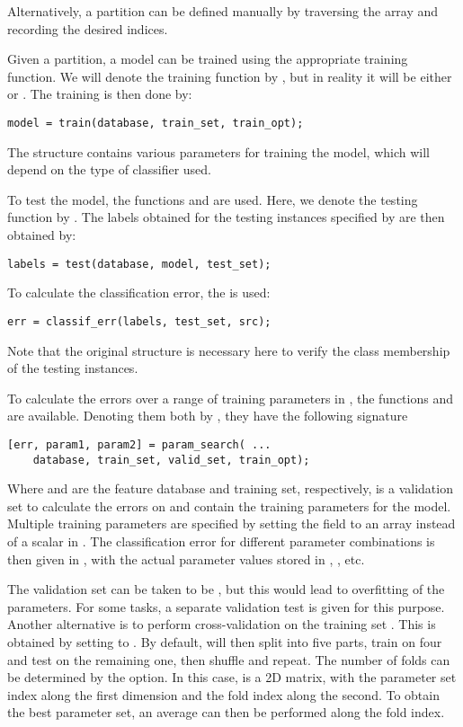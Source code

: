 \documentclass[twocolumn]{article}
\begin{document}
Alternatively, a partition can be defined manually by traversing the  array and recording the desired indices.

Given a partition, a model can be trained using the appropriate training function. We will denote the training function by , but in reality it will be either  or . The training is then done by:
\begin{lstlisting}
model = train(database, train_set, train_opt);
\end{lstlisting}
The structure  contains various parameters for training the model, which will depend on the type of classifier used.

To test the model, the functions  and  are used. Here, we denote the testing function by . The labels obtained for the testing instances specified by  are then obtained by:
\begin{lstlisting}
labels = test(database, model, test_set);
\end{lstlisting}
To calculate the classification error, the  is used:
\begin{lstlisting}
err = classif_err(labels, test_set, src);
\end{lstlisting}
Note that the original  structure is necessary here to verify the class membership of the testing instances.

To calculate the errors over a range of training parameters in , the functions  and  are available. Denoting them both by , they have the following signature
\begin{lstlisting}
[err, param1, param2] = param_search( ...
	database, train_set, valid_set, train_opt);
\end{lstlisting}
Where  and  are the feature database and training set, respectively,  is a validation set to calculate the errors on and  contain the training parameters for the model. Multiple training parameters are specified by setting the field to an array instead of a scalar in . The classification error for different parameter combinations is then given in , with the actual parameter values stored in , , etc.

The validation set can be taken to be , but this would lead to overfitting of the parameters. For some tasks, a separate validation test is given for this purpose. Another alternative is to perform cross-validation on the training set . This is obtained by setting  to \mcode{[]}. By default,  will then split  into five parts, train on four and test on the remaining one, then shuffle and repeat. The number of folds can be determined by the  option. In this case,  is a 2D matrix, with the parameter set index along the first dimension and the fold index along the second. To obtain the best parameter set, an average can then be performed along the fold index.
\end{document}
